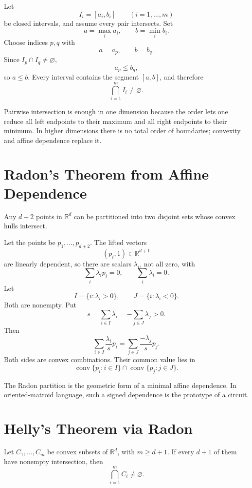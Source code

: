 Let
\[
  I_i=[a_i,b_i]
  \qquad(i=1,\ldots,m)
\]
be closed intervals, and assume every pair intersects.  Set
\[
  a=\max_i a_i,
  \qquad
  b=\min_i b_i.
\]
Choose indices \(p,q\) with
\[
  a=a_p,
  \qquad
  b=b_q.
\]
Since \(I_p\cap I_q\ne\varnothing\),
\[
  a_p\le b_q,
\]
so \(a\le b\).  Every interval contains the segment \([a,b]\), and therefore
\[
  \bigcap_{i=1}^m I_i\ne\varnothing.
\]

Pairwise intersection is enough in one dimension because the order lets one reduce all left endpoints to their maximum and all right endpoints to their minimum.  In higher dimensions there is no total order of boundaries; convexity and affine dependence replace it.

\section{Radon's Theorem from Affine Dependence}

\begin{theorem}[Radon]
Any \(d+2\) points in \(\mathbb R^d\) can be partitioned into two disjoint sets whose convex hulls intersect.
\end{theorem}

Let the points be \(p_1,\ldots,p_{d+2}\).  The lifted vectors
\[
  (p_i,1)\in\mathbb R^{d+1}
\]
are linearly dependent, so there are scalars \(\lambda_i\), not all zero, with
\[
  \sum_i\lambda_i p_i=0,
  \qquad
  \sum_i\lambda_i=0.
\]
Let
\[
  I=\{i:\lambda_i>0\},
  \qquad
  J=\{i:\lambda_i<0\}.
\]
Both are nonempty.  Put
\[
  s=\sum_{i\in I}\lambda_i
  =-\sum_{j\in J}\lambda_j>0.
\]
Then
\[
  \sum_{i\in I}\frac{\lambda_i}{s}p_i
  =
  \sum_{j\in J}\frac{-\lambda_j}{s}p_j.
\]
Both sides are convex combinations.  Their common value lies in
\[
  \operatorname{conv}\{p_i:i\in I\}
  \cap
  \operatorname{conv}\{p_j:j\in J\}.
\]

The Radon partition is the geometric form of a minimal affine dependence.  In oriented-matroid language, such a signed dependence is the prototype of a circuit.

\section{Helly's Theorem via Radon}

\begin{theorem}
Let \(C_1,\ldots,C_m\) be convex subsets of \(\mathbb R^d\), with \(m\ge d+1\).  If every \(d+1\) of them have nonempty intersection, then
\[
  \bigcap_{i=1}^mC_i\ne\varnothing.
\]
\end{theorem}

